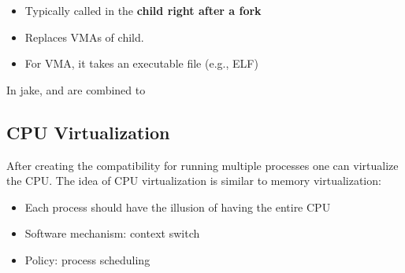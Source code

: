 \begin{itemize}
    \item Typically called in the \textbf{child right after a fork}
    \item Replaces VMAs of child.
    \item For  VMA, it takes an executable file (e.g., ELF)
\end{itemize}

\newpar{}

In jake,  and  are combined to 


\subsection{CPU Virtualization}
After creating the compatibility for running multiple processes one can virtualize the CPU. The idea of CPU virtualization is similar to memory virtualization:
\begin{itemize}
    \item Each process should have the illusion of having the entire CPU
    \item Software mechanism: context switch
    \item Policy: process scheduling
\end{itemize}
